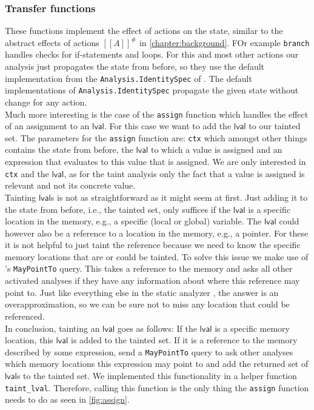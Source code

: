       \subsubsection{Transfer functions}
        These functions implement the effect of actions on the state, similar to the abstract effects of actions $[\![A]\!]^{\#}$ in \autoref{chapter:background}. FOr example \texttt{branch} handles checks for if-statements and loops. For this and most other actions our analysis just propagates the state from before, so they use the default implementation from the \texttt{Analysis.IdentitySpec} of \gob. The default implementations of \texttt{Analysis.IdentitySpec} propagate the given state without change for any action.\\
        Much more interesting is the case of the \texttt{assign} function which handles the effect of an assignment to an $\textsf{lval}$. For this case we want to add the $\textsf{lval}$ to our tainted set. The parameters for the \texttt{assign} function are: \texttt{ctx} which amongst other things contains the state from before, the $\textsf{lval}$ to which a value is assigned and an expression that evaluates to this value that is assigned. We are only interested in \texttt{ctx} and the $\textsf{lval}$, as for the taint analysis only the fact that a value is assigned is relevant and not its concrete value.\\
        Tainting $\textsf{lval}$s is not as straightforward as it might seem at first. Just adding it to the state from before, i.e., the tainted set, only suffices if the $\textsf{lval}$ is a specific location in the memory, e.g., a specific (local or global) variable. The $\textsf{lval}$ could however also be a reference to a location in the memory, e.g., a pointer. For these it is not helpful to just taint the reference because we need to know the specific memory locations that are or could be tainted. To solve this issue we make use of \gob's \texttt{MayPointTo} query. This takes a reference to the memory and asks all other activated analyses if they have any information about where this reference may point to. Just like everything else in the static analyzer \gob, the answer is an overapproximation, so we can be sure not to miss any location that could be referenced.\\
        In conclusion, tainting an $\textsf{lval}$ goes as follows: If the $\textsf{lval}$ is a specific memory location, this $\textsf{lval}$ is added to the tainted set. If it is a reference to the memory described by some expression, send a \texttt{MayPointTo} query to ask other analyses which memory locations this expression may point to and add the returned set of $\textsf{lval}$s to the tainted set. We implemented this functionality in a helper function \texttt{taint\_lval}. Therefore, calling this function is the only thing the \texttt{assign} function needs to do as seen in \autoref{fig:assign}.

